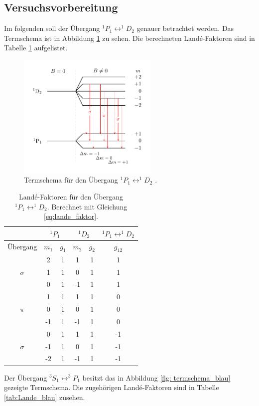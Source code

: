 \subsection{Versuchsvorbereitung}

Im folgenden soll der Übergang  $^1P_1\leftrightarrow ^1\!\!D_2$ genauer betrachtet werden.
Das Termschema ist in Abbildung \ref{fig: termschema_rot} zu sehen. Die berechneten Landé-Faktoren %
sind in Tabelle \ref{tab:Lande_rot} aufgelistet.

\FloatBarrier
\begin{figure}[h]
  \centering
  \includegraphics[width=0.6\textwidth]{pics/termschema_rot.pdf}
  \caption{Termschema für den Übergang $^1P_1\leftrightarrow ^1\!\!D_2$ \cite{luckyjosh}.}
  \label{fig: termschema_rot}
\end{figure}
\FloatBarrier
\FloatBarrier
\begin{table}
	\centering
  \caption{Landé-Faktoren für den Übergang $^1P_1\leftrightarrow ^1\!\!D_2$.  Berechnet mit Gleichung \eqref{eq:lande_faktor}.}
	\label{tab:Lande_rot}
	\begin{tabular}{cccccc}
		\toprule
		{} & \multicolumn{2}{c}{${}^1P_1$}  & \multicolumn{2}{c}{${}^1D_2$}  & $^1P_1\leftrightarrow ^1\!\!D_2$ \\
		\midrule
		 Übergang &   $m_1$  & $g_{1}$ & $m_2$ & $ g_2$  & $g_{12}$  \\
		\midrule
		& 2 & 1 & 1 & 1 & 1\\
		$\sigma$& 1 & 1 & 0 & 1 & 1\\
		& 0 & 1 & -1 & 1 & 1\\
		\midrule
		& 1 & 1 & 1 & 1 & 0\\
		$\pi$ & 0 & 1 & 0 & 1 & 0\\
		& -1 & 1 & -1 & 1 & 0\\
		\midrule
		& 0 & 1 & 1 & 1 & -1\\
		$\sigma$ & -1 & 1 & 0 & 1 & -1\\
		& -2 & 1 & -1 & 1 & -1\\\bottomrule
	\end{tabular}

\end{table}
\FloatBarrier
Der Übergang $^3S_1\leftrightarrow ^3\!\!P_1$ besitzt das in Abbildung \ref{fig: termschema_blau} gezeigte
Termschema. Die zugehörigen Landé-Faktoren sind in Tabelle \ref{tab:Lande_blau} zusehen. %


